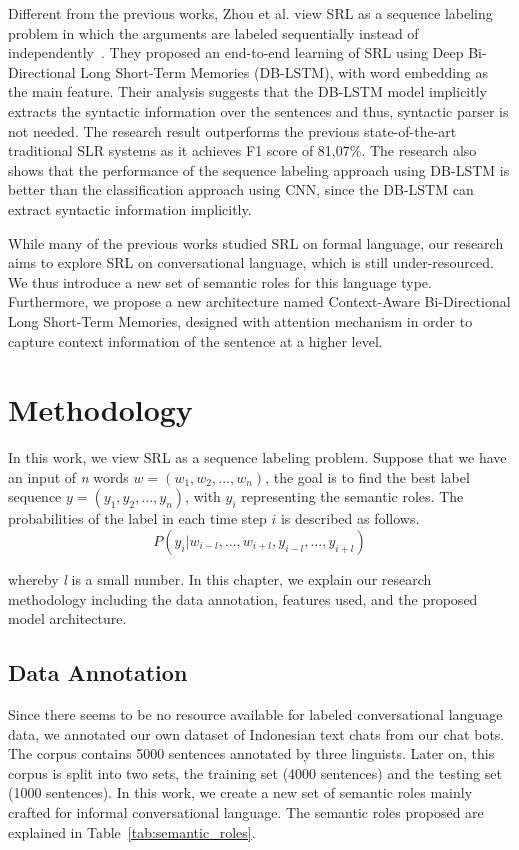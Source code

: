 Different from the previous works, Zhou et al. view SRL as a sequence labeling problem in which the arguments are labeled sequentially instead of independently~\cite{zhou2015end}. They proposed an end-to-end learning of SRL using Deep Bi-Directional Long Short-Term Memories (DB-LSTM), with word embedding as the main feature. Their analysis suggests that the DB-LSTM model implicitly extracts the syntactic information over the sentences and thus, syntactic parser is not needed. The research result outperforms the previous state-of-the-art traditional SLR systems as it achieves F1 score of 81,07\%. The research also shows that the performance of the sequence labeling approach using DB-LSTM is better than the classification approach using CNN, since the DB-LSTM can extract syntactic information implicitly.

While many of the previous works studied SRL on formal language, our research aims to explore SRL on conversational language, which is still under-resourced. We thus introduce a new set of semantic roles for this language type. Furthermore, we propose a new architecture named Context-Aware Bi-Directional Long Short-Term Memories, designed with attention mechanism in order to capture context information of the sentence at a higher level.

\section{Methodology}
In this work, we view SRL as a sequence labeling problem. Suppose that we have an input of \textit{n} words $w = (w_{1}, w_{2}, ..., w_{n})$, the goal is to find the best label sequence $y = (y_{1}, y_{2}, ..., y_{n})$, with $y_{i}$ representing the semantic roles. The probabilities of the label in each time step $i$ is described as follows.
\begin{equation}
P(y_{i}|w_{i-l}, ..., w_{i+l},y_{i-l}, ..., y_{i+l})
\end{equation}

whereby \textit{l} is a small number. In this chapter, we explain our research methodology including the data annotation, features used, and the proposed model architecture. 

\subsection{Data Annotation}
Since there seems to be no resource available for labeled conversational language data, we annotated our own dataset of Indonesian text chats from our chat bots. The corpus contains 5000 sentences annotated by three linguists. Later on, this corpus is split into two sets, the training set (4000 sentences) and the testing set (1000 sentences). In this work, we create a new set of semantic roles mainly crafted for informal conversational language. The semantic roles proposed are explained in Table~\ref{tab:semantic_roles}.

